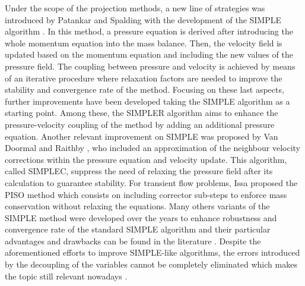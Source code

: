 \documentclass[final,3p,times,11pt,onecolumn]{myElsarticle}
\numberwithin{equation}{section}
\begin{document}
Under the scope of the projection methods, a new line of strategies was introduced by Patankar and Spalding with the development of the SIMPLE algorithm \cite{patankar1972}. In this method, a pressure equation is derived after introducing the whole momentum equation into the mass balance. Then, the velocity field is updated based on the momentum equation and including the new values of the pressure field. The coupling between pressure and velocity is achieved by means of an iterative procedure where relaxation factors are needed to improve the stability and convergence rate of the method. Focusing on these last aspects, further improvements have been developed taking the SIMPLE algorithm as a starting point. Among these, the SIMPLER algorithm \cite{patankar1980} aims to enhance the pressure-velocity coupling of the method by adding an additional pressure equation. Another relevant improvement on SIMPLE was proposed by Van Doormal and Raithby \cite{vanDoormal}, who included an approximation of the neighbour velocity corrections within the pressure equation and velocity update. This algorithm, called SIMPLEC, suppress the need of relaxing the pressure field after its calculation to guarantee stability. For transient flow problems, Issa proposed the PISO method \cite{issa,issa2} which consists on including corrector sub-steps to enforce mass conservation without relaxing the equations.%
Many others variants of the SIMPLE method were developed over the years to enhance robustness and convergence rate of the standard SIMPLE algorithm \cite{tao,qu,cheng2,sun} and their particular advantages and drawbacks can be found in the literature \cite{moukalled, wang,liu}. Despite the aforementioned efforts to improve SIMPLE-like algorithms, the errors introduced by the decoupling of the variables cannot be completely eliminated which makes the topic still relevant nowadays \cite{li2017efficient,xiao2018consistent,aoussou2018iterated}.%
\end{document}
